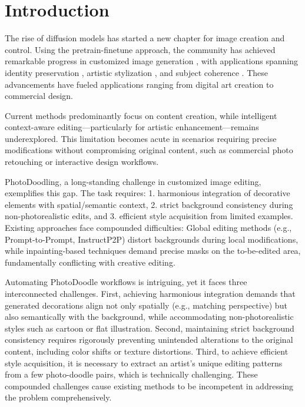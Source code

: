
\section{Introduction}

The rise of diffusion models has started a new chapter for image creation and control. Using the pretrain-finetune approach, the community has achieved remarkable progress in customized image generation \cite{ruiz2023dreambooth, TI, lora}, with applications spanning identity preservation \cite{facechain}, artistic stylization \cite{song2024processpainter, zhang2023inversion,sohn2023styledrop,ahn2024dreamstyler}, and subject coherence \cite{customdiff,ruiz2023dreambooth, TI,lora,ruiz2024hyperdreambooth,jiang2024videobooth,zhu2024multibooth}. These advancements have fueled applications ranging from digital art creation to commercial design.

Current methods predominantly focus on content creation, while intelligent context-aware editing—particularly for artistic enhancement—remains underexplored. This limitation becomes acute in scenarios requiring precise modifications without compromising original content, such as commercial photo retouching or interactive design workflows.

PhotoDoodling, a long-standing challenge in customized image editing, exemplifies this gap. The task requires: 1. harmonious integration of decorative elements with spatial/semantic context, 2. strict background consistency during non-photorealistic edits, and 3. efficient style acquisition from limited examples. Existing approaches face compounded difficulties: Global editing methods (e.g., Prompt-to-Prompt\cite{p2p}, InstructP2P\cite{brooks2023instructpix2pix}) distort backgrounds during local modifications, while inpainting-based techniques\cite{zhang2024magicbrush} demand precise masks on the to-be-edited area, fundamentally conflicting with creative editing.



Automating PhotoDoodle workflows is intriguing, yet it faces three interconnected challenges. First, achieving harmonious integration demands that generated decorations align not only spatially (e.g., matching perspective) but also semantically with the background, while accommodating non-photorealistic styles such as cartoon or flat illustration. Second, maintaining strict background consistency requires rigorously preventing unintended alterations to the original content, including color shifts or texture distortions. Third, to achieve efficient style acquisition, it is necessary to extract an artist's unique editing patterns from a few photo-doodle pairs, which is technically challenging. These compounded challenges cause existing methods to be incompetent in addressing the problem comprehensively.


